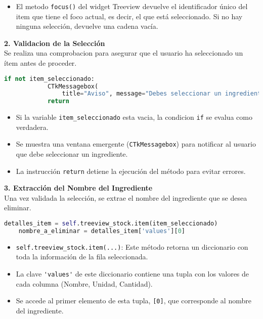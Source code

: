 \documentclass[a4paper,12pt]{article}
\begin{document}
\begin{itemize} 
\item El metodo \verb|focus()| del widget Treeview devuelve el identificador único del item que tiene el foco actual, es decir, el que está seleccionado. Si no hay ninguna selección, devuelve una cadena vacía. \end{itemize}

\textbf{2. Validacion de la Selección}\\
Se realiza una comprobacion para asegurar que el usuario ha seleccionado un ítem antes de proceder.
\begin{lstlisting}[language=Python, caption={desenglosando codigo}, frame=single]
    if not item_seleccionado:
            CTkMessagebox(
                title="Aviso", message="Debes seleccionar un ingrediente de la tabla.", icon="warning")
            return
\end{lstlisting}
\begin{itemize} 
\item Si la variable \verb|item_seleccionado| esta vacia, la condicion \verb|if| se evalua como verdadera. 
\item Se muestra una ventana emergente (\verb|CTkMessagebox|) para notificar al usuario que debe seleccionar un ingrediente. 
\item La instrucción \verb|return| detiene la ejecución del método para evitar errores. 
\end{itemize}
\textbf{3. Extracción del Nombre del Ingrediente}\\
Una vez validada la selección, se extrae el nombre del ingrediente que se desea eliminar.
\begin{lstlisting}[language=Python, caption={desenglosando codigo}, frame=single]
    detalles_item = self.treeview_stock.item(item_seleccionado)
    nombre_a_eliminar = detalles_item['values'][0]
\end{lstlisting}
\begin{itemize} 
\item \verb|self.treeview_stock.item(...)|: Este método retorna un diccionario con toda la información de la fila seleccionada. 
\item La clave \verb|'values'| de este diccionario contiene una tupla con los valores de cada columna (Nombre, Unidad, Cantidad). 
\item Se accede al primer elemento de esta tupla, \verb|[0]|, que corresponde al nombre del ingrediente. 
\end{itemize}
\newpage
\end{document}
